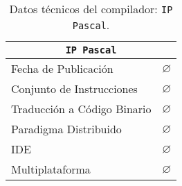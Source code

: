\begin{table}[h]

\begin{center}

\begin{tabular}{|l|l|}\hline
\multicolumn{2}{|c|}{\texttt{IP Pascal}}\\ 
\hline
\hline
Fecha de Publicación & $\varnothing$ \\ \hline
Conjunto de Instrucciones & $\varnothing$ \\ \hline
Traducción a Código Binario & $\varnothing$ \\ \hline
Paradigma Distribuido & $\varnothing$ \\ \hline
IDE & $\varnothing$ \\ \hline
Multiplataforma & $\varnothing$ \\ \hline
\end{tabular}

\caption{Datos técnicos del compilador: \texttt{IP Pascal}.}

\end{center}

\end{table}